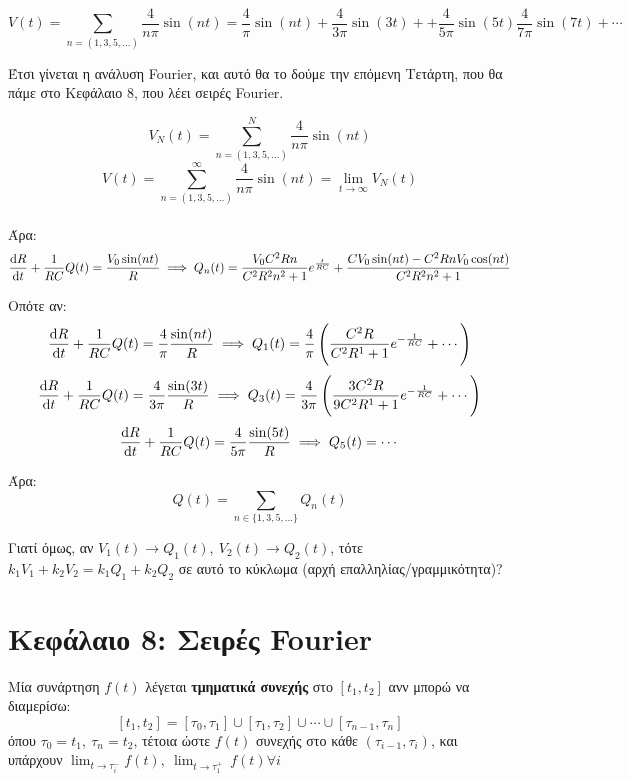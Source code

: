 \documentclass[11pt,a4paper,titlepage,draft]{article}
\begin{document}
\[
V(t)= \sum _{n = (1,3,5,\dots)} \frac{4}{n \pi} \sin (n t) =
\frac{4}{ \pi} \sin (n t) + \frac{4}{3 \pi} \sin (3 t) +
+ \frac{4}{5 \pi} \sin (5 t) \frac{4}{7 \pi} \sin (7 t) + \cdots
\]

Έτσι γίνεται η ανάλυση \textlatin{Fourier}, και αυτό θα το δούμε την επόμενη Τετάρτη, που θα πάμε στο Κεφάλαιο 8, που λέει σειρές \textlatin{Fourier}.

\[
V_N(t) = \sum _{n = (1,3,5,\dots)}^N \frac{4}{n \pi} \sin (n t)
\]
\[
V(t) = \sum _{n = (1,3,5,\dots)}^\infty \frac{4}{n \pi} \sin (n t) = \lim_{t \to \infty} V_N(t)
\]

\paragraph{}
Άρα:
\[
 \frac{\dif R}{\dif t}  + \frac{1}{RC}Q(t) = \frac{V_0 \sin (nt)}{R} \implies
 Q_n(t) = \frac{V_0C^2Rn}{C^2R^2n^2+1}e^{\frac{t}{RC}} + \frac{CV_0\sin (nt) - C^2RnV_0 \cos (nt)}{C^2R^2n^2+1}
\]

Οπότε αν:
\[
 \frac{\dif R}{\dif t}  + \frac{1}{RC}Q(t) = \frac{4}{\pi} \frac{\sin (nt)}{R} \implies
 Q_1(t) = \frac{4}{\pi} \left( \frac{C^2R}{C^2R^1+1} e^{-\frac{1}{RC}}+ \cdots \right)
\]
\[
 \frac{\dif R}{\dif t}  + \frac{1}{RC}Q(t) = \frac{4}{3\pi} \frac{\sin (3t)}{R} \implies
 Q_3(t) = \frac{4}{3\pi} \left( \frac{3C^2R}{9C^2R^1+1} e^{-\frac{1}{RC}}+ \cdots \right)
\]
\[
 \frac{\dif R}{\dif t}  + \frac{1}{RC}Q(t) = \frac{4}{5\pi} \frac{\sin (5t)}{R} \implies
 Q_5(t) = \cdots
\]

Άρα:
\[
Q(t) = \sum_{n \in \lbrace1,3,5,\dots\rbrace}Q_n(t)
\]

Γιατί όμως, αν \(V_1(t) \rightarrow Q_1(t), \ V_2(t) \rightarrow Q_2(t)\), τότε \(k_1V_1+k_2V_2 = k_1Q_1 +k_2Q_2\) σε αυτό το κύκλωμα (αρχή επαλληλίας/γραμμικότητα)?


\section{Κεφάλαιο 8: Σειρές Fourier}

\begin{defn*}{}
Μία συνάρτηση \(f(t)\) λέγεται \textbf{τμηματικά συνεχής} στο \([t_1,t_2]\) ανν μπορώ να διαμερίσω:
\[ [t_1,t_2] = [\tau_0,\tau_1] \cup [\tau_1,\tau_2] \cup \cdots \cup [\tau_{n-1},\tau_n] \]
όπου \(\tau_0 = t_1,\ \tau_n = t_2\), τέτοια ώστε \(f(t)\) συνεχής στο κάθε \((\tau_{i-1},\tau_i)\), και υπάρχουν \(\lim_{t \to \tau_i^-} f(t),\ \lim_{t \to \tau_1^+}\ f(t) \forall i\)
\end{defn*}
\end{document}
